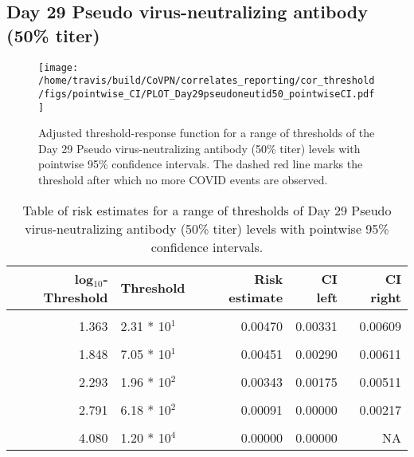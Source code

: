 \documentclass[]{book}
\theoremstyle{definition}
\theoremstyle{definition}
\theoremstyle{definition}
\newcommand{\1}{\mathbbm{1}}
\begin{document}
\clearpage

\clearpage

\clearpage

\hypertarget{day-29-pseudo-virus-neutralizing-antibody-50-titer}{%
\subsection{Day 29 Pseudo virus-neutralizing antibody (50\% titer)}\label{day-29-pseudo-virus-neutralizing-antibody-50-titer}}

\begin{figure}[H]
\centering
\texttt{[image: /home/travis/build/CoVPN/correlates\_reporting/cor\_threshold/figs/pointwise\_CI/PLOT\_Day29pseudoneutid50\_pointwiseCI.pdf]}
\caption{Adjusted threshold-response function for a range of thresholds of the
  Day 29 Pseudo virus-neutralizing antibody (50\% titer) levels with pointwise 95\% confidence intervals. The dashed red line marks the threshold after which no more COVID events are observed. }
\end{figure}
\begin{table}[!h]

\caption{\label{tab:unnamed-chunk-359}Table of risk estimates for a range of thresholds of Day 29 Pseudo virus-neutralizing antibody (50\% titer) levels with pointwise 95\% confidence intervals.}
\centering
\begin{tabular}[t]{rlrrr}
\toprule
log$_{10}$-Threshold & Threshold & Risk estimate & CI left & CI right\\
\midrule
\cellcolor{gray!6}{0.699} & \cellcolor{gray!6}{5.00 * 10$^0$} & \cellcolor{gray!6}{0.00585} & \cellcolor{gray!6}{0.00442} & \cellcolor{gray!6}{0.00727}\\
1.363 & 2.31 * 10$^1$ & 0.00470 & 0.00331 & 0.00609\\
\cellcolor{gray!6}{1.628} & \cellcolor{gray!6}{4.25 * 10$^1$} & \cellcolor{gray!6}{0.00469} & \cellcolor{gray!6}{0.00318} & \cellcolor{gray!6}{0.00619}\\
1.848 & 7.05 * 10$^1$ & 0.00451 & 0.00290 & 0.00611\\
\cellcolor{gray!6}{2.078} & \cellcolor{gray!6}{1.20 * 10$^2$} & \cellcolor{gray!6}{0.00399} & \cellcolor{gray!6}{0.00237} & \cellcolor{gray!6}{0.00561}\\
2.293 & 1.96 * 10$^2$ & 0.00343 & 0.00175 & 0.00511\\
\cellcolor{gray!6}{2.537} & \cellcolor{gray!6}{3.44 * 10$^2$} & \cellcolor{gray!6}{0.00143} & \cellcolor{gray!6}{0.00016} & \cellcolor{gray!6}{0.00270}\\
2.791 & 6.18 * 10$^2$ & 0.00091 & 0.00000 & 0.00217\\
\cellcolor{gray!6}{3.109} & \cellcolor{gray!6}{1.29 * 10$^3$} & \cellcolor{gray!6}{0.00199} & \cellcolor{gray!6}{0.00000} & \cellcolor{gray!6}{0.00481}\\
4.080 & 1.20 * 10$^4$ & 0.00000 & 0.00000 & NA\\
\bottomrule
\end{tabular}
\end{table}
\end{document}
